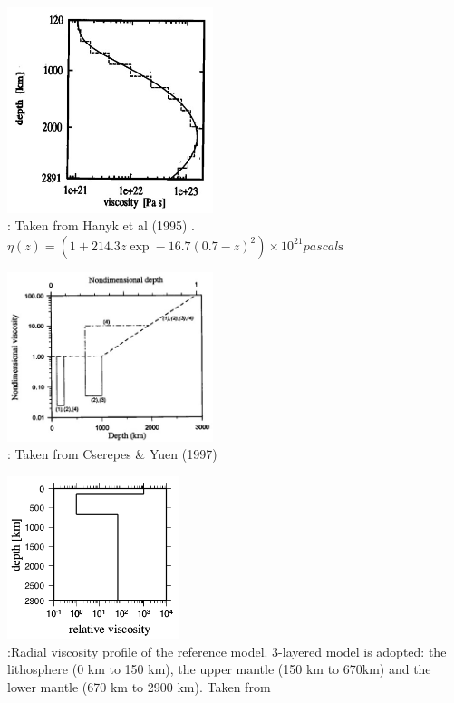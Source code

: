 
\begin{center}
\includegraphics[width=6cm]{images/viscosity_profile/hamy95}\\
{\captionfont \nineteenninetyfive: Taken from Hanyk et al (1995) \cite{hamy95}. 
$\eta(z)=(1+214.3z\exp-16.7(0.7-z)^2)\times 10^{21}\si{pascal\second}$ }
\end{center}

\begin{center}
\includegraphics[width=6cm]{images/viscosity_profile/csyu97}\\
{\captionfont \nineteenninetyseven: Taken from Cserepes \& Yuen (1997) \cite{csyu97}} 
\end{center}

\begin{center}
\includegraphics[width=5cm]{images/viscosity_profile/yohk01}\\
{\captionfont \twothousandone:Radial viscosity profile of the reference model. 3-layered model is adopted: 
the lithosphere (0 km to 150 km), the upper mantle (150 km to 670km) 
and the lower mantle (670 km to 2900 km). Taken from \cite{yohk01}}
\end{center}


